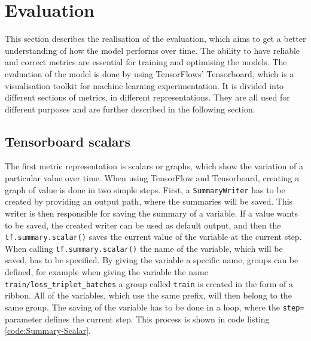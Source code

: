 \section{Evaluation}
\label{sec:Realisation-Evaluation}
This section describes the realisation of the evaluation, which aims to get a better understanding of how the model performs over time. The ability to have reliable and correct metrics are essential for training and optimising the models. The evaluation of the model is done by using TensorFlows' Tensorboard\footnotemark, which is a visualisation toolkit for machine learning experimentation. It is divided into different sections of metrics, in different representations. They are all used for different purposes and are further described in the following section.

\subsection{Tensorboard scalars}
\label{sub:Tensorboard-Scalars}
The first metric representation is scalars or graphs, which show the variation of a particular value over time. When using TensorFlow and Tensorboard, creating a graph of value is done in two simple steps. First, a \texttt{SummaryWriter} has to be created by providing an output path, where the summaries will be saved. This writer is then responsible for saving the summary of a variable. If a value wants to be saved, the created writer can be used as default output, and then the  \texttt{tf.summary.scalar()} saves the current value of the variable at the current step. When calling \texttt{tf.summary.scalar()} the name of the variable, which will be saved, has to be specified. By giving the variable a specific name, groups can be defined, for example when giving the variable the name \texttt{train/loss\_triplet\_batches} a group called \texttt{train} is created in the form of a ribbon. All of the variables, which use the same prefix, will then belong to the same group. The saving of the variable has to be done in a loop, where the \texttt{step=} parameter defines the current step. This process is shown in code listing \ref{code:Summary-Scalar}.

